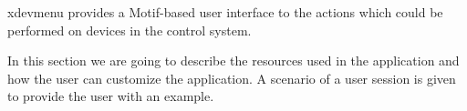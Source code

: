 %
%
%
%
%
%
%
%
%
%
xdevmenu provides a Motif-based user interface to the actions which could be   
performed on devices in the control system.

In this section we are going to describe the resources used in the
application and how the user can customize the application. A scenario of
a user session is given to provide the user with an example.

